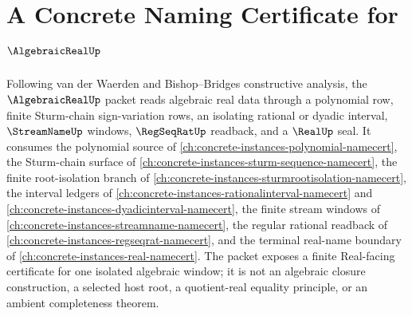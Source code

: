 \chapter{A Concrete Naming Certificate for $\AlgebraicRealUp$}
\label{ch:concrete-instances-algebraic-real-namecert}

Following van der Waerden and Bishop--Bridges constructive analysis, the $\AlgebraicRealUp$ packet reads algebraic real data through a polynomial row, finite Sturm-chain sign-variation rows, an isolating rational or dyadic interval, $\StreamNameUp$ windows, $\RegSeqRatUp$ readback, and a $\RealUp$ seal. It consumes the polynomial source of \autoref{ch:concrete-instances-polynomial-namecert}, the Sturm-chain surface of \autoref{ch:concrete-instances-sturm-sequence-namecert}, the finite root-isolation branch of \autoref{ch:concrete-instances-sturmrootisolation-namecert}, the interval ledgers of \autoref{ch:concrete-instances-rationalinterval-namecert} and \autoref{ch:concrete-instances-dyadicinterval-namecert}, the finite stream windows of \autoref{ch:concrete-instances-streamname-namecert}, the regular rational readback of \autoref{ch:concrete-instances-regseqrat-namecert}, and the terminal real-name boundary of \autoref{ch:concrete-instances-real-namecert}. The packet exposes a finite Real-facing certificate for one isolated algebraic window; it is not an algebraic closure construction, a selected host root, a quotient-real equality principle, or an ambient completeness theorem.

